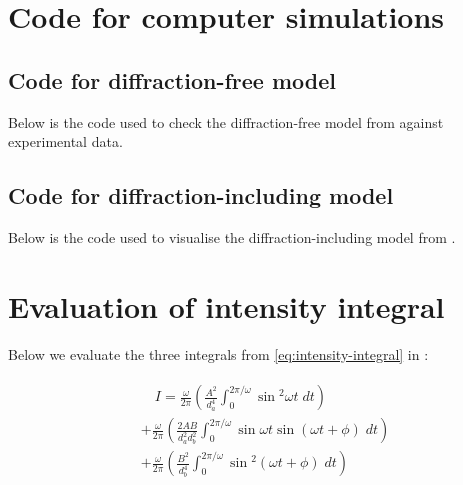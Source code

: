 \documentclass{paper}
\begin{document}
\begin{appendices}

\section{Code for computer simulations}
\subsection{Code for diffraction-free model}
\label{appendix:diffraction-free-code}
\renewcommand*{\thepage}{A\arabic{page}}
\renewcommand{\theequation}{A.\arabic{equation}}
\setcounter{equation}{0}
Below is the code used to check the diffraction-free model from  against experimental data.


\subsection{Code for diffraction-including model}
\label{appendix:diffraction-code}
Below is the code used to visualise the diffraction-including model from .



\section{Evaluation of intensity integral}

\label{appendix:intensity-integral}
\setcounter{equation}{0}
\renewcommand*{\thepage}{B\arabic{page}}
\renewcommand{\theequation}{B.\arabic{equation}}


Below we evaluate the three integrals from \eqref{eq:intensity-integral} in :

\begin{align}
    \begin{aligned}
    \label{eq:the-three-integrals}
        &\quad{}I =\frac{\omega}{2\pi}\left(\frac{A^{2}}{d_{a}^{4}}\int_{0}^{2\pi/\omega}\sin{}^    {2}\omega{}t \; dt \right)  \\
        &+ \frac{\omega}{2\pi}\left(\frac{2AB}{d_{a}^{2}d_{b}^{2}}\int_{0}^{2\pi/\omega}\sin{\omega{}t}    \sin(\omega{}t + \phi) \; dt \right) \\
        &+ \frac{\omega}{2\pi}\left(\frac{B^{2}}{d_{b}^{4}}\int_{0}^{2\pi/\omega}\sin{}^{2}(\omega{}t +     \phi) \; dt \right) \\
    \end{aligned}
\end{align}
            

\end{appendices}
\end{document}
